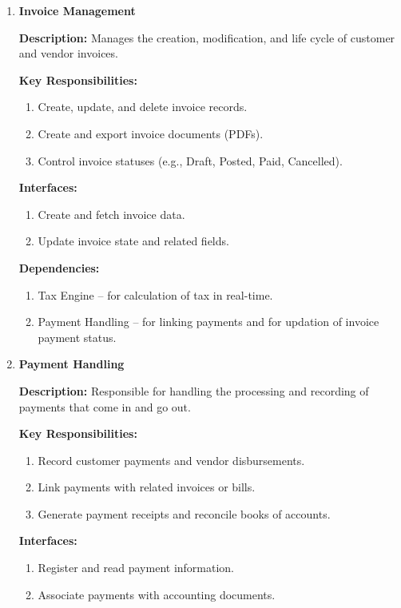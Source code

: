 \documentclass[11pt,a4paper]{article}
\begin{document}
\begin{enumerate}
    \item \textbf{Invoice Management}
    
    \textbf{Description:} Manages the creation, modification, and life cycle of customer and vendor invoices.
    \medskip

    \textbf{Key Responsibilities:}
    \begin{enumerate}
        \item Create, update, and delete invoice records.
        \item Create and export invoice documents (PDFs).
        \item Control invoice statuses (e.g., Draft, Posted, Paid, Cancelled).
    \end{enumerate}

    \textbf{Interfaces:}
    \begin{enumerate}
        \item Create and fetch invoice data.
        \item Update invoice state and related fields.
    \end{enumerate}

    \textbf{Dependencies:}
    \begin{enumerate}
        \item Tax Engine – for calculation of tax in real-time.
        \item Payment Handling – for linking payments and for updation of invoice payment status.
    \end{enumerate}

    \item \textbf{Payment Handling}
    
    \textbf{Description:} Responsible for handling the processing and recording of payments that come in and go out.
    \medskip

    \textbf{Key Responsibilities:}
    \begin{enumerate}
        \item Record customer payments and vendor disbursements.
        \item Link payments with related invoices or bills.
        \item Generate payment receipts and reconcile books of accounts.
    \end{enumerate}

    \textbf{Interfaces:}
    \begin{enumerate}
        \item Register and read payment information.
        \item Associate payments with accounting documents.
    \end{enumerate}


\end{enumerate}
\end{document}
